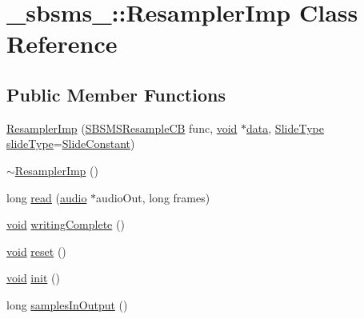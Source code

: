 \hypertarget{class__sbsms___1_1_resampler_imp}{}\section{\+\_\+sbsms\+\_\+\+:\+:Resampler\+Imp Class Reference}
\label{class__sbsms___1_1_resampler_imp}
\subsection*{Public Member Functions}
\begin{DoxyCompactItemize}
\item 
\hyperlink{class__sbsms___1_1_resampler_imp_ad3f93e45f0308c383cc9c10bd91ae555}{Resampler\+Imp} (\hyperlink{namespace__sbsms___a1b88e19baa604934b1c3cdec1fae8d4b}{S\+B\+S\+M\+S\+Resample\+CB} func, \hyperlink{sound_8c_ae35f5844602719cf66324f4de2a658b3}{void} $\ast$\hyperlink{lib_2expat_8h_ac39e72a1de1cb50dbdc54b08d0432a24}{data}, \hyperlink{namespace__sbsms___a208fc16133e115cda214f563a3a19a49}{Slide\+Type} \hyperlink{class__sbsms___1_1_resampler_imp_ab16a2cd83f35754395686dbd7357af1f}{slide\+Type}=\hyperlink{namespace__sbsms___a208fc16133e115cda214f563a3a19a49a380a96a0990704566ac50b5015935912}{Slide\+Constant})
\item 
\hyperlink{class__sbsms___1_1_resampler_imp_a67004563dabce25cbe1bb672f13fedb0}{$\sim$\+Resampler\+Imp} ()
\item 
long \hyperlink{class__sbsms___1_1_resampler_imp_a808db4aac23b59de9f73b140c79507cb}{read} (\hyperlink{namespace__sbsms___a11786cc5bd221ff534972ae350477324}{audio} $\ast$audio\+Out, long frames)
\item 
\hyperlink{sound_8c_ae35f5844602719cf66324f4de2a658b3}{void} \hyperlink{class__sbsms___1_1_resampler_imp_ac4fbc596b264eee2651d26b5b48f1434}{writing\+Complete} ()
\item 
\hyperlink{sound_8c_ae35f5844602719cf66324f4de2a658b3}{void} \hyperlink{class__sbsms___1_1_resampler_imp_a6a4275363cb3aafdd7b5d99f713a216e}{reset} ()
\item 
\hyperlink{sound_8c_ae35f5844602719cf66324f4de2a658b3}{void} \hyperlink{class__sbsms___1_1_resampler_imp_a0ea9e2a98eb2a3260d3bc480c5b03dfb}{init} ()
\item 
long \hyperlink{class__sbsms___1_1_resampler_imp_a0088e9411b916c61ed77745ff1e37ec9}{samples\+In\+Output} ()
\end{DoxyCompactItemize}
